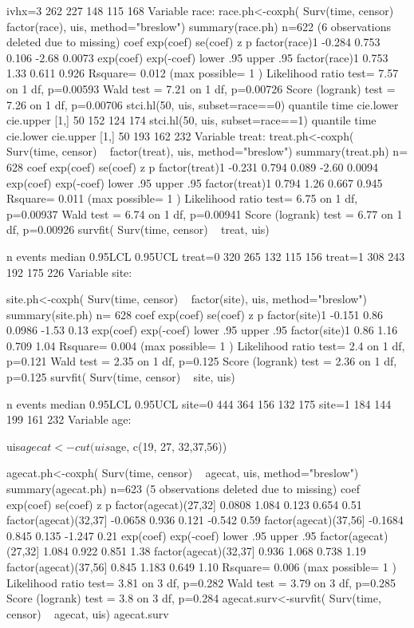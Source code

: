 ivhx=3 262    227    148     115     168
Variable race:
race.ph<-coxph( Surv(time, censor) ~ factor(race), uis, method="breslow")
summary(race.ph)
  n=622 (6 observations deleted due to missing)
                coef exp(coef) se(coef)     z      p
factor(race)1 -0.284     0.753    0.106 -2.68 0.0073
              exp(coef) exp(-coef) lower .95 upper .95
factor(race)1     0.753       1.33     0.611     0.926
Rsquare= 0.012   (max possible= 1 )
Likelihood ratio test= 7.57  on 1 df,   p=0.00593
Wald test            = 7.21  on 1 df,   p=0.00726
Score (logrank) test = 7.26  on 1 df,   p=0.00706
stci.hl(50, uis, subset=race==0)
     quantile time cie.lower cie.upper
[1,]       50  152       124       174
stci.hl(50, uis, subset=race==1)
     quantile time cie.lower cie.upper
[1,]       50  193       162       232
Variable treat:
treat.ph<-coxph( Surv(time, censor) ~ factor(treat), uis, method="breslow")
summary(treat.ph)
  n= 628 
                 coef exp(coef) se(coef)     z      p
factor(treat)1 -0.231     0.794    0.089 -2.60 0.0094
               exp(coef) exp(-coef) lower .95 upper .95
factor(treat)1     0.794       1.26     0.667     0.945
Rsquare= 0.011   (max possible= 1 )
Likelihood ratio test= 6.75  on 1 df,   p=0.00937
Wald test            = 6.74  on 1 df,   p=0.00941
Score (logrank) test = 6.77  on 1 df,   p=0.00926
survfit( Surv(time, censor) ~ treat, uis)

          n events median 0.95LCL 0.95UCL
treat=0 320    265    132     115     156
treat=1 308    243    192     175     226
Variable site:

site.ph<-coxph( Surv(time, censor) ~ factor(site), uis, method="breslow")
summary(site.ph)
  n= 628 
                coef exp(coef) se(coef)     z    p
factor(site)1 -0.151      0.86   0.0986 -1.53 0.13
              exp(coef) exp(-coef) lower .95 upper .95
factor(site)1      0.86       1.16     0.709      1.04
Rsquare= 0.004   (max possible= 1 )
Likelihood ratio test= 2.4   on 1 df,   p=0.121
Wald test            = 2.35  on 1 df,   p=0.125
Score (logrank) test = 2.36  on 1 df,   p=0.125
survfit( Surv(time, censor) ~ site, uis)

         n events median 0.95LCL 0.95UCL
site=0 444    364    156     132     175
site=1 184    144    199     161     232
Variable age:

uis$agecat<-cut(uis$age, c(19, 27, 32,37,56))

agecat.ph<-coxph( Surv(time, censor) ~ agecat, uis, method="breslow")
summary(agecat.ph)
  n=623 (5 observations deleted due to missing)
                         coef exp(coef) se(coef)      z    p
factor(agecat)(27,32]  0.0808     1.084    0.123  0.654 0.51
factor(agecat)(32,37] -0.0658     0.936    0.121 -0.542 0.59
factor(agecat)(37,56] -0.1684     0.845    0.135 -1.247 0.21
                      exp(coef) exp(-coef) lower .95 upper .95
factor(agecat)(27,32]     1.084      0.922     0.851      1.38
factor(agecat)(32,37]     0.936      1.068     0.738      1.19
factor(agecat)(37,56]     0.845      1.183     0.649      1.10
Rsquare= 0.006   (max possible= 1 )
Likelihood ratio test= 3.81  on 3 df,   p=0.282
Wald test            = 3.79  on 3 df,   p=0.285
Score (logrank) test = 3.8   on 3 df,   p=0.284
agecat.surv<-survfit( Surv(time, censor) ~ agecat, uis)
agecat.surv

